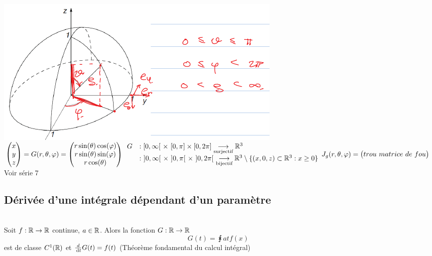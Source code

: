 \documentclass[12pt,a4paper]{article}
\begin{document}
\\
\includegraphics[scale=1]{images/coord_sph}\\
$\begin{pmatrix}
	x\\
	y\\	
	z
\end{pmatrix} = G(r,\theta,\varphi) =
\begin{pmatrix}
	r\sin(\theta)\cos(\varphi)\\
	r\sin(\theta)\sin(\varphi)\\
	r\cos(\theta)
\end{pmatrix}\\
\begin{array}{ll}
	G 	&: [0,\infty[\ \times\ [0,\pi] \times [0,2\pi] \underset{\text{surjectif}}{\longrightarrow} \R^3\\
 		&:\ ]0,\infty[\ \times\ ]0,\pi[\ \times\ ]0,2\pi[\ \underset{\text{bijectif}}{\longrightarrow} \R^3 \setminus\{(x,0,z) \subset \R^3 : x \geq 0\}
\end{array}\\
J_g(r,\theta,\varphi) = \begin{pmatrix}
{trou}\ matrice\ de\ fou
\end{pmatrix}$
Voir série 7

\subsection{Dérivée d'une intégrale dépendant d'un paramètre}
	\\
	Soit $f:\mathbb{R} \to \mathbb{R}$ continue, $a\in\mathbb{R}$. Alors la fonction $G:\mathbb{R} \to \mathbb{R}$
	\begin{equation*}
		G(t) = \intx{a}{t}{f(x)}
	\end{equation*}
	est de classe $C^1(\mathbb{R})$ et $\frac{d}{\, \mathrm d t}G(t) = f(t)$ (Théorème fondamental du calcul intégral)
	
\end{document}
